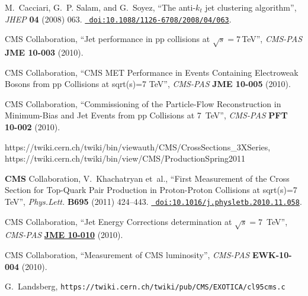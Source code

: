 \begin{thebibliography}{10}
M.~Cacciari, G.~P. Salam, and G.~Soyez, ``{The anti-{$k_t$} jet clustering
  algorithm}'', {\em JHEP} {\bf 04} (2008)
063.
  \href{http://dx.doi.org/10.1088/1126-6708/2008/04/063}{{\tt
  doi:10.1088/1126-6708/2008/04/063}}.

{CMS Collaboration}, ``Jet performance in pp collisions at $\sqrt{s} =
  7$\,TeV'', {\em CMS-PAS} {\bf JME 10-003} (2010).

{CMS Collaboration}, ``CMS MET Performance in Events Containing Electroweak
  Bosons from pp Collisions at sqrt(s)=7 TeV'', {\em CMS-PAS} {\bf JME 10-005}
  (2010).







{CMS Collaboration}, ``Commissioning of the Particle-Flow Reconstruction in
  Minimum-Bias and Jet Events from pp Collisions at 7~TeV'', {\em CMS-PAS} {\bf
  PFT 10-002} (2010).

 https://twiki.cern.ch/twiki/bin/viewauth/CMS/CrossSections\_3XSeries, 
https://twiki.cern.ch/twiki/bin/view/CMS/ProductionSpring2011

{\bf CMS} Collaboration, V.~Khachatryan {et~al.}, ``{First Measurement of the
  Cross Section for Top-Quark Pair Production in Proton-Proton Collisions at
  sqrt(s)=7 TeV}'', {\em Phys.Lett.} {\bf B695} (2011) 424--443.
  \href{http://dx.doi.org/10.1016/j.physletb.2010.11.058}{{\tt
  doi:10.1016/j.physletb.2010.11.058}}.

{CMS Collaboration}, ``Jet Energy Corrections determination at
  {$\sqrt{s}=7$}~TeV'', {\em CMS-PAS} {\bf
  \href{http://cdsweb.cern.ch/record/1308178}{JME 10-010}} (2010).

{CMS Collaboration}, ``Measurement of CMS luminosity'', {\em CMS-PAS} {\bf
  EWK-10-004} (2010).

 G.~Landsberg, {\tt https://twiki.cern.ch/twiki/pub/CMS/EXOTICA/cl95cms.c}

\end{thebibliography}\endgroup
